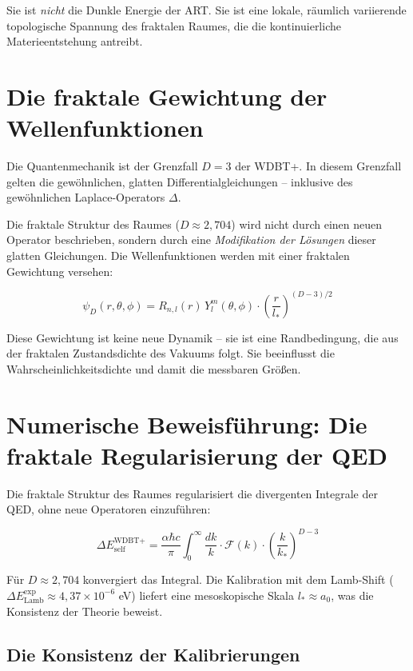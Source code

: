 \documentclass[12pt,a4paper]{article}
\begin{document}
Sie ist \emph{nicht} die Dunkle Energie der ART. Sie ist eine lokale, räumlich variierende topologische Spannung des fraktalen Raumes, die die kontinuierliche Materieentstehung antreibt.

\section{Die fraktale Gewichtung der Wellenfunktionen}

Die Quantenmechanik ist der Grenzfall \( D = 3 \) der WDBT+. In diesem Grenzfall gelten die gewöhnlichen, glatten Differentialgleichungen – inklusive des gewöhnlichen Laplace-Operators \( \Delta \).

Die fraktale Struktur des Raumes (\( D \approx 2,704 \)) wird nicht durch einen neuen Operator beschrieben, sondern durch eine \emph{Modifikation der Lösungen} dieser glatten Gleichungen. Die Wellenfunktionen werden mit einer fraktalen Gewichtung versehen:

\begin{equation}
\psi_D(r, \theta, \phi) = R_{n,l}(r) \, Y_l^m(\theta, \phi) \cdot \left( \frac{r}{l_*} \right)^{(D-3)/2}
\end{equation}

Diese Gewichtung ist keine neue Dynamik – sie ist eine Randbedingung, die aus der fraktalen Zustandsdichte des Vakuums folgt. Sie beeinflusst die Wahrscheinlichkeitsdichte und damit die messbaren Größen.

\section{Numerische Beweisführung: Die fraktale Regularisierung der QED}

Die fraktale Struktur des Raumes regularisiert die divergenten Integrale der QED, ohne neue Operatoren einzuführen:

\begin{equation}
\Delta E_{\text{self}}^{\text{WDBT+}} = \frac{\alpha \hbar c}{\pi} \int_0^{\infty} \frac{dk}{k} \cdot \mathcal{F}(k) \cdot \left( \frac{k}{k_*} \right)^{D-3}
\end{equation}

Für \(D \approx 2,704\) konvergiert das Integral. Die Kalibration mit dem Lamb-Shift (\(\Delta E_{\text{Lamb}}^{\text{exp}} \approx 4,37 \times 10^{-6}\) eV) liefert eine mesoskopische Skala \(l_* \approx a_0\), was die Konsistenz der Theorie beweist.

\subsection{Die Konsistenz der Kalibrierungen}
\end{document}
